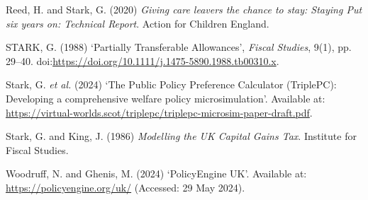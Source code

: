 \documentclass[
  letterpaper,
  DIV=11,
  numbers=noendperiod]{scrartcl}
\newlength{\cslhangindent}
\newenvironment{CSLReferences}[2] %
 {\begin{list}{}{%
  \setlength{\itemindent}{0pt}
  \setlength{\leftmargin}{0pt}
  \setlength{\parsep}{0pt}
  \ifodd #1
   \setlength{\leftmargin}{\cslhangindent}
   \setlength{\itemindent}{-1\cslhangindent}
  \fi
  \setlength{\itemsep}{#2\baselineskip}}}
 {\end{list}}
\begin{document}
\begin{CSLReferences}{0}{1}
Reed, H. and Stark, G. (2020) \emph{Giving care leavers the chance to
stay: {Staying} {Put} six years on: {Technical} {Report}}. Action for
Children England.

STARK, G. (1988) {`Partially {Transferable} {Allowances}'}, \emph{Fiscal
Studies}, 9(1), pp. 29--40.
doi:\url{https://doi.org/10.1111/j.1475-5890.1988.tb00310.x}.

Stark, G. \emph{et al.} (2024) {`The {Public} {Policy} {Preference}
{Calculator} ({TriplePC}): {Developing} a comprehensive welfare policy
microsimulation'}. Available at:
\url{https://virtual-worlds.scot/triplepc/triplepc-microsim-paper-draft.pdf}.

Stark, G. and King, J. (1986) \emph{Modelling the {UK} {Capital} {Gains}
{Tax}}. Institute for Fiscal Studies.

Woodruff, N. and Ghenis, M. (2024) {`{PolicyEngine} {UK}'}. Available
at: \url{https://policyengine.org/uk/} (Accessed: 29 May 2024).

\end{CSLReferences}
\end{document}
